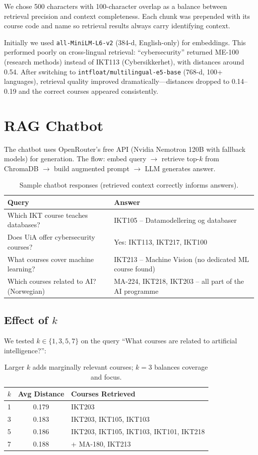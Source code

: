 \documentclass[11pt,a4paper]{article}
\begin{document}
We chose 500 characters with 100-character overlap as a balance between retrieval precision and context completeness. Each chunk was prepended with its course code and name so retrieval results always carry identifying context.

Initially we used \texttt{all-MiniLM-L6-v2} (384-d, English-only) for embeddings. This performed poorly on cross-lingual retrieval: ``cybersecurity'' returned ME-100 (research methods) instead of IKT113 (Cybersikkerhet), with distances around 0.54. After switching to \texttt{intfloat/multilingual-e5-base} (768-d, 100+ languages), retrieval quality improved dramatically---distances dropped to 0.14--0.19 and the correct courses appeared consistently.

\section{RAG Chatbot}

The chatbot uses OpenRouter's free API (Nvidia Nemotron 120B with fallback models) for generation. The flow: embed query $\to$ retrieve top-$k$ from ChromaDB $\to$ build augmented prompt $\to$ LLM generates answer.

\begin{table}[H]
\centering
\begin{tabular}{lp{8cm}}
\toprule
Query & Answer \\
\midrule
Which IKT course teaches databases? & IKT105 -- Datamodellering og databaser \\
Does UiA offer cybersecurity courses? & Yes: IKT113, IKT217, IKT100 \\
What courses cover machine learning? & IKT213 -- Machine Vision (no dedicated ML course found) \\
Which courses related to AI? (Norwegian) & MA-224, IKT218, IKT203 -- all part of the AI programme \\
\bottomrule
\end{tabular}
\caption{Sample chatbot responses (retrieved context correctly informs answers).}
\end{table}

\subsection*{Effect of $k$}

We tested $k \in \{1, 3, 5, 7\}$ on the query ``What courses are related to artificial intelligence?'':

\begin{table}[H]
\centering
\begin{tabular}{lcl}
\toprule
$k$ & Avg Distance & Courses Retrieved \\
\midrule
1 & 0.179 & IKT203 \\
3 & 0.183 & IKT203, IKT105, IKT103 \\
5 & 0.186 & IKT203, IKT105, IKT103, IKT101, IKT218 \\
7 & 0.188 & + MA-180, IKT213 \\
\bottomrule
\end{tabular}
\caption{Larger $k$ adds marginally relevant courses; $k{=}3$ balances coverage and focus.}
\end{table}
\end{document}
